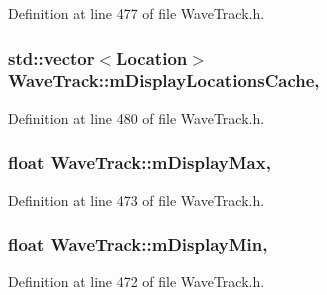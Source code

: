 Definition at line 477 of file Wave\+Track.\+h.

\subsubsection[{\texorpdfstring{m\+Display\+Locations\+Cache}{mDisplayLocationsCache}}]{\setlength{\rightskip}{0pt plus 5cm}std\+::vector$<${\bf Location}$>$ Wave\+Track\+::m\+Display\+Locations\+Cache\hspace{0.3cm}{\ttfamily [mutable]}, {\ttfamily [protected]}}\hypertarget{class_wave_track_a83d2ef555e3b4d6c0a3dab21fa83c2b0}{}\label{class_wave_track_a83d2ef555e3b4d6c0a3dab21fa83c2b0}


Definition at line 480 of file Wave\+Track.\+h.

\subsubsection[{\texorpdfstring{m\+Display\+Max}{mDisplayMax}}]{\setlength{\rightskip}{0pt plus 5cm}float Wave\+Track\+::m\+Display\+Max\hspace{0.3cm}{\ttfamily [mutable]}, {\ttfamily [protected]}}\hypertarget{class_wave_track_a8dbec05f10d02f2c2547d846ca8cfc21}{}\label{class_wave_track_a8dbec05f10d02f2c2547d846ca8cfc21}


Definition at line 473 of file Wave\+Track.\+h.

\subsubsection[{\texorpdfstring{m\+Display\+Min}{mDisplayMin}}]{\setlength{\rightskip}{0pt plus 5cm}float Wave\+Track\+::m\+Display\+Min\hspace{0.3cm}{\ttfamily [mutable]}, {\ttfamily [protected]}}\hypertarget{class_wave_track_a144805b8b5d766763d93cf1c47bb0cc0}{}\label{class_wave_track_a144805b8b5d766763d93cf1c47bb0cc0}


Definition at line 472 of file Wave\+Track.\+h.

